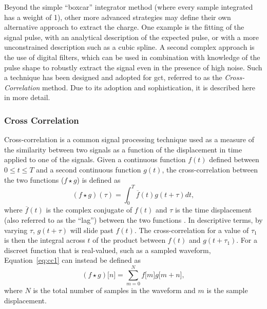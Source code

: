 Beyond the simple ``boxcar'' integrator method (where every sample integrated has a weight of 1), other more advanced strategies may define their own alternative approach to extract the charge. One example is the fitting of the signal pulse, with an analytical description of the expected pulse, or with a more unconstrained description such as a cubic spline. A second complex approach is the use of digital filters, which can be used in combination with knowledge of the pulse shape to robustly extract the signal even in the presence of high noise. Such a technique has been designed and adopted for \gls{gct}, referred to as the \textit{Cross-Correlation} method. Due to its adoption and sophistication, it is described here in more detail. 

\subsubsection{Cross Correlation} \label{section:crosscorrelation}

Cross-correlation is a common signal processing technique used as a measure of the similarity between two signals as a function of the displacement in time applied to one of the signals. Given a continuous function $f(t)$ defined between $0 \le t \le T$ and a second continuous function $g(t)$, the cross-correlation between the two functions ($f \star g$) is defined as 
\begin{equation} \label{eq:cc1}
(f \star g)(\tau) = \int_0^T \overline{f}(t)g(t + \tau)dt,
\end{equation}
where $\overline{f}(t)$ is the complex conjugate of $f(t)$ and $\tau$ is the time displacement (also referred to as the ``lag'') between the two functions \cite{wolfram-crosscorrelate}. In descriptive terms, by varying $\tau$, $g(t + \tau)$ will slide past $f(t)$. The cross-correlation for a value of $\tau_1$ is then the integral across $t$ of the product between $f(t)$ and $g(t + \tau_1)$. For a discreet function that is real-valued, such as a sampled waveform, Equation~\ref{eq:cc1} can instead be defined as
\begin{equation} \label{eq:cc2}
(f \star g)\lbrack n \rbrack = \sum_{m=0}^N f\lbrack m \rbrack g\lbrack m + n\rbrack,
\end{equation}
where $N$ is the total number of samples in the waveform and $m$ is the sample displacement. 

